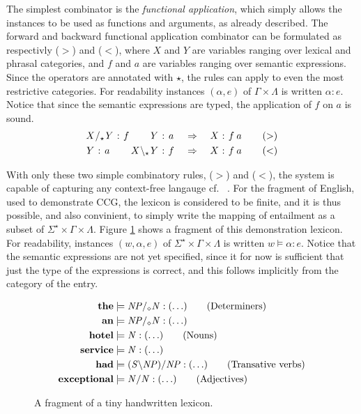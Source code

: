 The simplest combinator is the \emph{functional application}, which simply allows the instances to be used as functions and arguments, as already described. The forward and backward functional application combinator can be formulated as respectivly ($>$) and ($<$), where $X$ and $Y$ are variables ranging over lexical and phrasal categories, and $f$ and $a$ are variables ranging over semantic expressions. Since the operators are annotated with $\star$, the rules can apply to even the most restrictive categories. For readability instances $(\alpha, e)$ of $\Gamma \times \Lambda$ is written $\alpha : e$. Notice that since the semantic expressions are typed, the application of $f$ on $a$ is sound. 
\begin{align*}
  \catvar{X}/_\star \catvar{Y} : \fvar{f}  \quad\quad                  \catvar{Y} : \fvar{a} 
  &\quad\Rightarrow\quad
  \catvar{X} : \fvar{f} \fvar{a} 
  \tag{$>$} \\
  \catvar{Y}            : \fvar{a}  \quad\quad  \catvar{X} \bsl_\star \catvar{Y} : \fvar{f}
  &\quad\Rightarrow\quad
  \catvar{X} : \fvar{f} \fvar{a}
  \tag{$<$}
\end{align*}

With only these two simple combinatory rules, ($>$) and ($<$), the system is capable of capturing any context-free langauge cf.\ \citeauthor{sp} . For the fragment of English, used to demonstrate CCG, the lexicon is considered to be finite, and it is thus possible, and also convinient, to simply write the mapping of entailment as a subset of $\Sigma^\star \times \Gamma \times \Lambda$. Figure \ref{fig:TinyLex} shows a fragment of this demonstration lexicon. For readability, instances $(w, \alpha, e)$ of $\Sigma^\star \times \Gamma \times \Lambda$ is written $w \models \alpha : e$. Notice that the semantic expressions are not yet specified, since it for now is sufficient that just the type of the expressions is correct, and this follows implicitly from the category of the entry.
\begin{figure}[ht]
\vspace{-.5em}
\begin{align*}
  \mathbf{the}       &\models {\mathit{NP}} /_\diamond {\mathit{N}}    : (\ldots)    \tag{Determiners} \\
  \mathbf{an}        &\models {\mathit{NP}} /_\diamond {\mathit{N}}    : (\ldots)    \\
  \mathbf{hotel}     &\models {\mathit{N}}               : (\ldots)                 \tag{Nouns} \\
  \mathbf{service}   &\models {\mathit{N}}               : (\ldots)                 \\
  \mathbf{had}       &\models ({\mathit{S}} \backslash {\mathit{NP}})/{\mathit{NP}}
                                                  : (\ldots)               \tag{Transative verbs} \\
  \mathbf{exceptional}   &\models {\mathit{N/N}}         : (\ldots)                 \tag{Adjectives}  
\end{align*}
\vspace{-1em}
\caption{A fragment of a tiny handwritten lexicon.}
\label{fig:TinyLex}
\end{figure}

